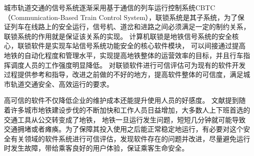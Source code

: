 城市轨道交通的信号系统逐渐采用基于通信的列车运行控制系统CBTC（Communication-Based Train Control System），联锁系统是其子系统，为了保证列车在线路上的安全运行，信号机、道岔和进路之间必须满足一定的制约关系，联锁系统的作用就是保证该关系的实现\cite{2006城市轨道交通信号设备}。
计算机联锁是地铁信号系统的安全核心，联锁软件是实现车站信号系统功能安全的核心软件模块，
可以间接通过提高地铁的自动化程度和管理水平，实现提高地铁整体的运营效率的目标，并且行车指挥调度人员的工作强度明显降低\cite{彭涛2014基于SCADE的信息物理融合系统的分析和设计方法}。
对联锁软件进行可信评估可为现有的软件开发过程提供参考和指导，改进之前做的不好的地方，提高软件整体的可信度，满足城市轨道交通安全、高效运行的要求。

高可信的软件不仅降低企业的维护成本还能提升使用人员的好感度。
文献\cite{杨学伟2012论城市地铁文化建设的策略}提到随着许多城市地铁建设步伐的不断加快和工作人员日益增加，大多数人上下班首选的交通工具从公交转变成了地铁，
地铁一旦运行发生问题，短短几分钟就可能导致交通拥堵或者瘫痪。为了保障其投入使用之后能正常稳定地运行，有必要对这个安全有关领域的软件系统进行可信评估，发现软件存在的问题并改进，尽量避免运行时发生故障，带给乘客良好的用户体验，保证乘客生命安全。

